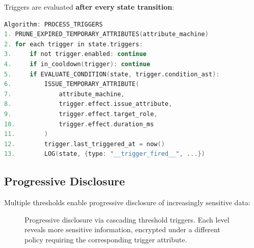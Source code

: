 \documentclass[sigconf,nonacm]{acmart}
\begin{document}
Triggers are evaluated \textbf{after every state transition}:

\vspace{4pt}
\begin{lstlisting}[language=C]
Algorithm: PROCESS_TRIGGERS
1. PRUNE_EXPIRED_TEMPORARY_ATTRIBUTES(attribute_machine)
2. for each trigger in state.triggers:
3.     if not trigger.enabled: continue
4.     if in_cooldown(trigger): continue
5.     if EVALUATE_CONDITION(state, trigger.condition_ast):
6.         ISSUE_TEMPORARY_ATTRIBUTE(
7.             attribute_machine,
8.             trigger.effect.issue_attribute,
9.             trigger.effect.target_role,
10.            trigger.effect.duration_ms
11.        )
12.        trigger.last_triggered_at = now()
13.        LOG(state, {type: "__trigger_fired__", ...})
\end{lstlisting}

\subsection{Progressive Disclosure}

Multiple thresholds enable progressive disclosure of increasingly sensitive data:

\begin{figure}[t]
\centering
{}
\caption{Progressive disclosure via cascading threshold triggers. Each level reveals more sensitive information, encrypted under a different policy requiring the corresponding trigger attribute.}
\label{fig:progressive}
\end{figure}
\end{document}
